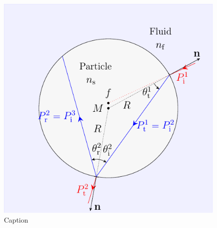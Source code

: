 \begin{figure}[htp]
  \centering
  \includegraphics[]{Plots/cache/ray.pdf}
  \caption{Caption}
  \label{fig:Th-ray_particle}
\end{figure}

\lipsum[1-2]

